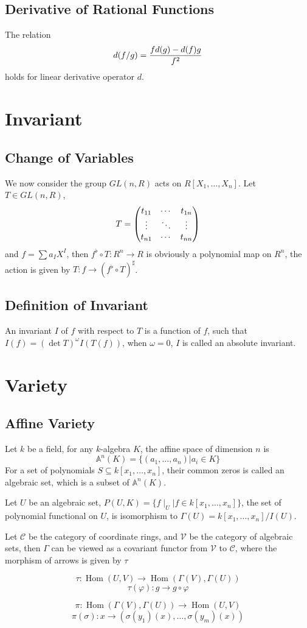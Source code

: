 \documentclass{article}
\def\hom{\mathop{\mathrm{Hom}}}
\begin{document}
\subsection{Derivative of Rational Functions}
The relation $$d(f/g) = {fd(g) - d(f)g \over f^2}$$ holds for linear derivative operator $d$.

\section{Invariant}
\subsection{Change of Variables}
We now consider the group $GL(n, R)$ acts on $R[X_1, \dots, X_n]$.
Let $T \in GL(n, R)$,
\begin{equation*}
  T = \left(\begin{matrix}
    t_{11} & \cdots & t_{1n} \cr
    \vdots & \ddots & \vdots \cr
    t_{n1} & \cdots & t_{nn}
\end{matrix}\right)
\end{equation*}
and $f = \sum a_I X^I$, then $f^\flat \circ T : R^n \to R$ is
obviously a polynomial map on $R^n$, the action is given by
$T : f \to (f^\flat \circ T)^\sharp$.


\subsection{Definition of Invariant}
An invariant $I$ of $f$ with respect to $T$ is a function of $f$,
such that $I(f) = (\det T)^\omega I(T(f))$, when $\omega = 0$,
$I$ is called an absolute invariant.


\section{Variety}
\subsection{Affine Variety}
Let $k$ be a field, for any $k$-algebra $K$, the affine space of dimension $n$
is $$\mathbb A^n(K) = \{(a_1, \dots, a_n) \vert a_i \in K\}$$
For a set of polynomials $S \subseteq k[x_1, \dots, x_n]$, their common zeros is
called an algebraic set, which is a subset of $\mathbb A^n(K)$.

Let $U$ be an algebraic set, $P(U, K) = \{ f\mid_U \vert f \in k[x_1, \dots, x_n] \}$,
the set of polynomial functional on $U$, is isomorphism to $\Gamma(U) = k[x_1, \dots, x_n]/I(U)$.

Let $\mathcal C$ be the category of coordinate rings, and $\mathcal V$ be the category of algebraic sets,
then $\Gamma$ can be viewed as a covariant functor from $\mathcal V$ to $\mathcal C$, where the morphism of
arrows is given by $\tau$

$$\tau : \hom(U, V) \to \hom(\Gamma(V), \Gamma(U))$$
$$\tau(\varphi) : g \to g \circ \varphi$$

$$\pi : \hom(\Gamma(V), \Gamma(U)) \to \hom(U, V)$$
$$\pi(\sigma) : x \to (\sigma(y_1)(x), \dots, \sigma(y_m)(x))$$
\end{document}
